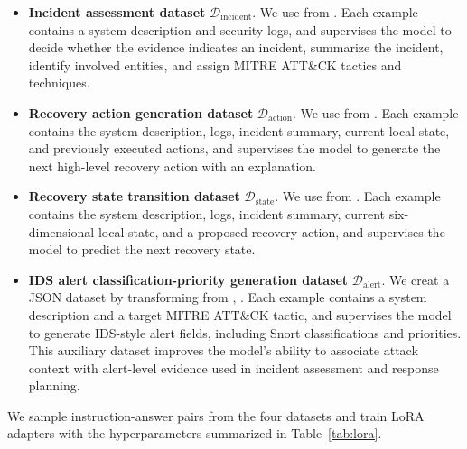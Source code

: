 \documentclass[sigconf]{acmart}
\begin{document}
  \begin{itemize}
      \item \textbf{Incident assessment dataset}
      $\mathcal{D}_{\mathrm{incident}}$. We use
       from
      \cite{kim26ndss}. Each example contains a system
      description and security logs, and supervises the model to decide whether
      the evidence indicates an incident, summarize the incident, identify
      involved entities, and assign MITRE ATT\&CK tactics and techniques.

      \item \textbf{Recovery action generation dataset}
      $\mathcal{D}_{\mathrm{action}}$. We use
       from
      \cite{kim26ndss}. Each example contains the system
      description, logs, incident summary, current local state, and previously
      executed actions, and supervises the model to generate the next high-level
      recovery action with an explanation.

      \item \textbf{Recovery state transition dataset}
      $\mathcal{D}_{\mathrm{state}}$. We use
       from
      \cite{kim26ndss}. Each example contains the system
      description, logs, incident summary, current six-dimensional local state,
      and a proposed recovery action, and supervises the model to predict the next
      recovery state.

      \item \textbf{IDS alert classification-priority generation dataset}
      $\mathcal{D}_{\mathrm{alert}}$. We creat a JSON dataset by transforming  from
      \cite{kim26ndss},
      . Each example contains a system description
      and a target MITRE ATT\&CK tactic, and supervises the model to generate
      IDS-style alert fields, including Snort classifications and priorities. This
      auxiliary dataset improves the model's ability to associate attack context
      with alert-level evidence used in incident assessment and response planning.
  \end{itemize}

  We sample instruction-answer pairs from the four datasets and train LoRA
  adapters with the hyperparameters summarized in Table~\ref{tab:lora}. 
\end{document}
